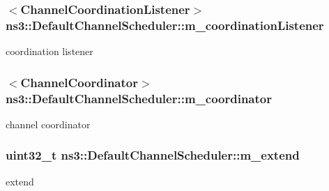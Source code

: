 \subsubsection[{\texorpdfstring{m\+\_\+coordination\+Listener}{m_coordinationListener}}]{$<${\bf Channel\+Coordination\+Listener}$>$ ns3\+::\+Default\+Channel\+Scheduler\+::m\+\_\+coordination\+Listener\hspace{0.3cm}{\ttfamily [private]}}\hypertarget{classns3_1_1DefaultChannelScheduler_aee8f7f9aa74f12f31bc7338508a1c8da}{}\label{classns3_1_1DefaultChannelScheduler_aee8f7f9aa74f12f31bc7338508a1c8da}


coordination listener 

\subsubsection[{\texorpdfstring{m\+\_\+coordinator}{m_coordinator}}]{$<${\bf Channel\+Coordinator}$>$ ns3\+::\+Default\+Channel\+Scheduler\+::m\+\_\+coordinator\hspace{0.3cm}{\ttfamily [private]}}\hypertarget{classns3_1_1DefaultChannelScheduler_a75891fa9160464561c9a74381f7238f4}{}\label{classns3_1_1DefaultChannelScheduler_a75891fa9160464561c9a74381f7238f4}


channel coordinator 

\subsubsection[{\texorpdfstring{m\+\_\+extend}{m_extend}}]{\setlength{\rightskip}{0pt plus 5cm}uint32\+\_\+t ns3\+::\+Default\+Channel\+Scheduler\+::m\+\_\+extend\hspace{0.3cm}{\ttfamily [private]}}\hypertarget{classns3_1_1DefaultChannelScheduler_a3a9b84c45c27a713bb2e9842a0b69992}{}\label{classns3_1_1DefaultChannelScheduler_a3a9b84c45c27a713bb2e9842a0b69992}


extend 

